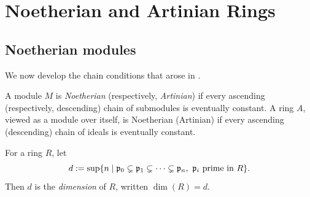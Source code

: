 \documentclass[11pt,a4paper]{article}
\begin{document}
\section*{Noetherian and Artinian Rings}
\subsection{Noetherian modules}
We now develop the chain conditions that arose in .
\setcounter{definition}{10}\begin{definition}
A module $M$ is \emph{Noetherian} (respectively, \emph{Artinian}) if every ascending (respectively, descending) chain of submodules is eventually constant. A ring $A$, viewed as a module over itself, is Noetherian (Artinian) if every ascending (descending) chain of ideals is eventually constant.
\end{definition}
\setcounter{definition}{11}\begin{definition}
For a ring $R$, let
\[d:=\sup\{n\mid\pp_0\subsetneq\pp_1\subsetneq\cdots\subsetneq\pp_n,\ \pp_i\text{ prime in }R\}.\]
Then $d$ is the \emph{dimension} of $R$, written $\dim(R)=d$.
\end{definition}
\end{document}
